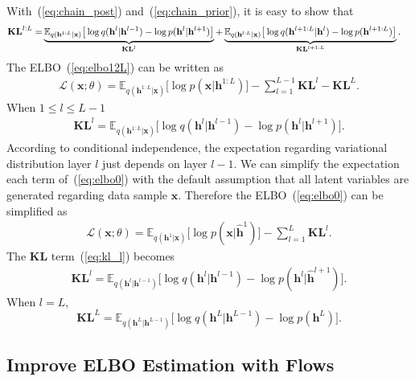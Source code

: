\documentclass[twoside]{article}
\begin{document}
With~(\ref{eq:chain_post}) and~(\ref{eq:chain_prior}), it is easy to show that
 \begin{align} \label{eq:kl_lL}
\textbf{\text{KL}}^{l:L} 
=&  \underbrace{\mathbb{E}_{q(\mathbf{h}^{1:L}|\mathbf{x})}\big[  \log q(\mathbf{h}^{l}|\mathbf{h}^{l-1})   - \log p(\mathbf{h}^{l}|\mathbf{h}^{l+1}) \big]}_{\mathbf{KL}^l} + \underbrace{\mathbb{E}_{q(\mathbf{h}^{l:L}|\mathbf{x})}\big[  \log q(\mathbf{h}^{l+1:L}|\mathbf{h}^{l})- \log p(\mathbf{h}^{l+1:L})  \big]}_{\mathbf{KL}^{l+1:L}}.
\end{align}
The ELBO~(\ref{eq:elbo12L}) can be written as 
 \begin{align} \label{eq:elbo0}
\mathcal{L}(\mathbf{x}; \theta) = \mathbb{E}_{q(\mathbf{h}^{1:L}|\mathbf{x})}\big[ \log p(\mathbf{x}|\mathbf{h}^{1:L})  \big] - \sum_{l=1}^{L-1} \mathbf{KL}^l -\mathbf{KL}^L.
\end{align}
When $1\leqslant l \leqslant L-1$
 \begin{align} \label{eq:kl_l}
 \mathbf{KL}^l=\mathbb{E}_{q(\mathbf{h}^{1:L}|\mathbf{x})}\big[  \log q(\mathbf{h}^{l}|\mathbf{h}^{l-1})   - \log p(\mathbf{h}^{l}|\mathbf{h}^{l+1}) \big].
 \end{align}
According to conditional independence, the expectation regarding variational distribution layer $l$ just depends on layer $l-1$. We can simplify the expectation each term of~(\ref{eq:elbo0}) with the default assumption that all latent variables are generated regarding data sample $\mathbf{x}$.  Therefore the ELBO~(\ref{eq:elbo0}) can be simplified as 
 \begin{align} \label{eq:elbo1}
\mathcal{L}(\mathbf{x}; \theta) = \mathbb{E}_{q(\mathbf{h}^{1}|\mathbf{x})}\big[ \log p(\mathbf{x}|\widehat{\mathbf{h}}^{1})  \big] - \sum_{l=1}^{L} \mathbf{KL}^l.
\end{align}
The $\mathbf{KL}$ term~(\ref{eq:kl_l}) becomes
\begin{align*}
 \mathbf{KL}^l=\mathbb{E}_{q(\mathbf{h}^{l}|\mathbf{h}^{l-1})}\big[  \log q(\mathbf{h}^{l}|\mathbf{h}^{l-1})   - \log p(\mathbf{h}^{l}|\widehat{\mathbf{h}}^{l+1}) \big].
 \end{align*}
When $l=L$, 
$$\mathbf{KL}^L =  \mathbb{E}_{q(\mathbf{h}^{L}|\mathbf{h}^{L-1})}\big[  \log q(\mathbf{h}^{L}|\mathbf{h}^{L-1})- \log p(\mathbf{h}^{L})  \big].$$

\subsection{Improve ELBO Estimation with Flows}
\end{document}
